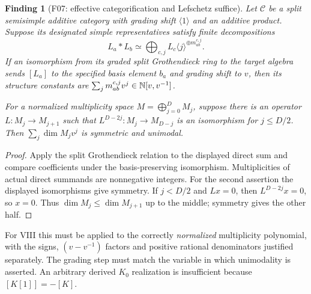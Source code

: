\documentclass[11pt,a4paper]{article}
\newcommand{\fid}[1]{\textsf{#1}}\newcommand{\gate}[1]{\textsf{#1}}
\theoremstyle{named}\newtheorem{finding}{Finding}[section]
\theoremstyle{definition}\newtheorem{definition}[finding]{Definition}
\theoremstyle{remark}\newtheorem{remark}[finding]{Remark}
\begin{document}
\begin{finding}[\fid{F07}: effective categorification and Lefschetz suffice]\label{f:category}
Let $\mathscr C$ be a split semisimple additive category with grading shift $\langle1\rangle$ and an additive product. Suppose its designated simple representatives satisfy finite decompositions
\[
 L_a*L_b\simeq\bigoplus_{c,j}L_c\langle j\rangle^{\oplus m_{ab}^{c,j}}.
\]
If an isomorphism from its graded split Grothendieck ring to the target algebra sends $[L_a]$ to the \emph{specified} basis element $b_a$ and grading shift to $v$, then its structure constants are
$\sum_jm_{ab}^{c,j}v^j\in\mathbb N[v,v^{-1}]$.

For a normalized multiplicity space $M=\bigoplus_{j=0}^D M_j$, suppose there is an operator $L:M_j\to M_{j+1}$ such that
$L^{D-2j}:M_j\to M_{D-j}$ is an isomorphism for $j\le D/2$. Then $\sum_j\dim M_jv^j$ is symmetric and unimodal.
\end{finding}
\begin{proof}
Apply the split Grothendieck relation to the displayed direct sum and compare coefficients under the basis-preserving isomorphism. Multiplicities of actual direct summands are nonnegative integers. For the second assertion the displayed isomorphisms give symmetry. If $j<D/2$ and $Lx=0$, then $L^{D-2j}x=0$, so $x=0$. Thus $\dim M_j\le\dim M_{j+1}$ up to the middle; symmetry gives the other half.
\end{proof}
For VIII this must be applied to the correctly \emph{normalized} multiplicity polynomial, with the signs, $(v-v^{-1})$ factors and positive rational denominators justified separately. The grading step must match the variable in which unimodality is asserted. An arbitrary derived $K_0$ realization is insufficient because $[K[1]]=-[K]$.
\end{document}
